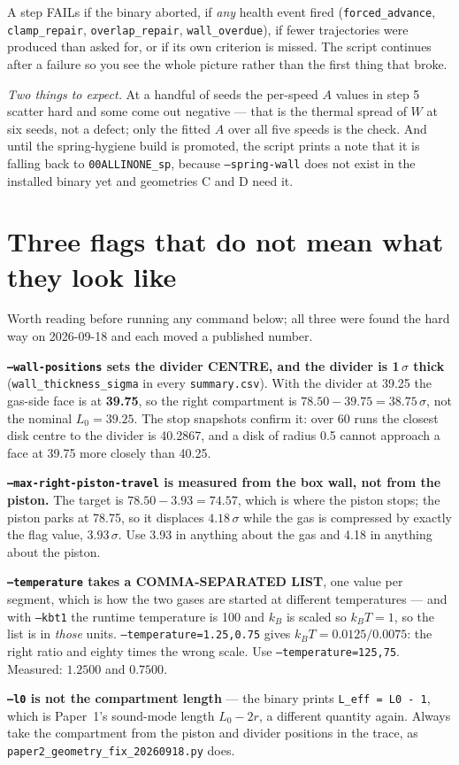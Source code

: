 \documentclass[11pt,a4paper]{article}
\newcommand{\cmd}[1]{\texttt{\footnotesize #1}}
\begin{document}
A step FAILs if the binary aborted, if \emph{any} health event fired
(\cmd{forced\_advance}, \cmd{clamp\_repair}, \cmd{overlap\_repair}, \cmd{wall\_overdue}), if fewer
trajectories were produced than asked for, or if its own criterion is missed. The script continues
after a failure so you see the whole picture rather than the first thing that broke.

\emph{Two things to expect.} At a handful of seeds the per-speed $A$ values in step 5 scatter hard
and some come out negative --- that is the thermal spread of $W$ at six seeds, not a defect; only
the fitted $A$ over all five speeds is the check. And until the spring-hygiene build is promoted,
the script prints a note that it is falling back to \cmd{00ALLINONE\_sp}, because
\cmd{--spring-wall} does not exist in the installed binary yet and geometries C and D need it.

\section{Three flags that do not mean what they look like}

Worth reading before running any command below; all three were found the hard way on 2026-09-18 and each moved a
published number.

\begin{howto}
\textbf{\cmd{--wall-positions} sets the divider CENTRE, and the divider is 1\,$\sigma$ thick}
(\cmd{wall\_thickness\_sigma} in every \cmd{summary.csv}). With the divider at 39.25 the gas-side face is at
\textbf{39.75}, so the right compartment is $78.50 - 39.75 = 38.75\,\sigma$, not the nominal $L_0 = 39.25$. The stop
snapshots confirm it: over 60 runs the closest disk centre to the divider is 40.2867, and a disk of radius 0.5 cannot
approach a face at 39.75 more closely than 40.25.

\textbf{\cmd{--max-right-piston-travel} is measured from the box wall, not from the piston.} The target is
$78.50 - 3.93 = 74.57$, which is where the piston stops; the piston parks at 78.75, so it displaces
$4.18\,\sigma$ while the gas is compressed by exactly the flag value, $3.93\,\sigma$. Use 3.93 in anything about the
gas and 4.18 in anything about the piston.

\textbf{\cmd{--temperature} takes a COMMA-SEPARATED LIST}, one value per segment, which is how the
two gases are started at different temperatures --- and with \cmd{--kbt1} the runtime temperature is
100 and $k_B$ is scaled so $k_BT = 1$, so the list is in \emph{those} units.
\cmd{--temperature=1.25,0.75} gives $k_BT = 0.0125/0.0075$: the right ratio and eighty times the
wrong scale. Use \cmd{--temperature=125,75}. Measured: $1.2500$ and $0.7500$.

\textbf{\cmd{--l0} is not the compartment length} --- the binary prints \cmd{L\_eff = L0 - 1}, which is Paper~1's
sound-mode length $L_0 - 2r$, a different quantity again. Always take the compartment from the piston and divider
positions in the trace, as \cmd{paper2\_geometry\_fix\_20260918.py} does.
\end{howto}
\end{document}
